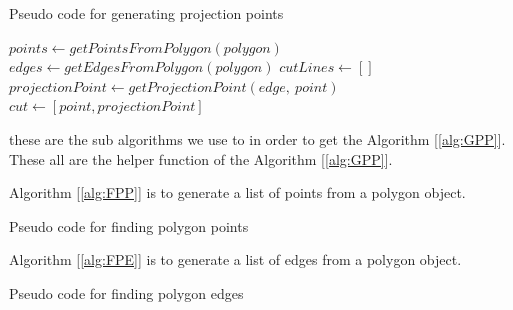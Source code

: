 \documentclass[a4paper,17pt]{article}
\begin{document}
\begin{algorithm}
    \caption{Pseudo code for generating projection points}
	\label{alg:GPP}
    \begin{algorithmic}[1]
    	    \State $points \leftarrow getPointsFromPolygon(polygon)$
    	    \State $edges \leftarrow getEdgesFromPolygon(polygon)$
    	    \State $cutLines \leftarrow []$
    	            \State $projectionPoint \leftarrow getProjectionPoint(edge,\ point)$
    	                \State $cut \leftarrow [point, projectionPoint]$
    	                \EndIf
    	            \EndIf
    			\EndFor
    		\EndFor
		\EndProcedure
	\end{algorithmic}
\end{algorithm}

these are the sub algorithms we use to in order to get the Algorithm [\ref{alg:GPP}]. These all are the helper function of the Algorithm [\ref{alg:GPP}].

Algorithm [\ref{alg:FPP}] is to generate a list of points from a polygon object.

\begin{algorithm}
    \caption{Pseudo code for finding polygon points}
    \label{alg:FPP}
    \begin{algorithmic}[1]
            \State {}
        \EndProcedure
    \end{algorithmic}
\end{algorithm}

Algorithm [\ref{alg:FPE}] is to generate a list of edges from a polygon object.

\begin{algorithm}
    \caption{Pseudo code for finding polygon edges}
    \label{alg:FPE}
    \begin{algorithmic}[1]
                \State {$line = [points[index], points[mod(index+1, pointsCount-1) ] $}
            \EndFor
            \State {}
        \EndProcedure
    \end{algorithmic}
\end{algorithm}
\end{document}
